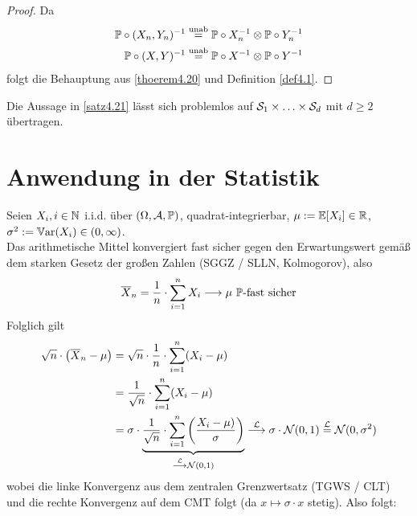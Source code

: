 \begin{proof}
	Da
	\begin{align*}
		\P\circ (X_n,Y_n)^{-1}&\stackeq{\text{unab}}\P\circ X_n^{-1}\otimes\P\circ Y_n^{-1}\\
		\P\circ (X,Y)^{-1}&\stackeq{\text{unab}}\P\circ X^{-1}\otimes\P\circ Y^{-1}
	\end{align*}
	folgt die Behauptung aus \ref{thoerem4.20} und Definition \ref{def4.1}.
\end{proof}

\begin{bemerkungnr}\label{bemerkung4.22}
	Die Aussage in \ref{satz4.21} lässt sich problemlos auf $\S_1\times\ldots\times\S_d$ mit $d\geq2$ übertragen.
\end{bemerkungnr}

\section*{Anwendung in der Statistik}
Seien $X_i,i\in\N$ i.i.d. über $(\Omega,\A,\P)$, quadrat-integrierbar, $\mu:=\E[X_i]\in\R$,\\ $\sigma^2:=\Var(X_i)\in(0,\infty)$.\\
Das arithmetische Mittel konvergiert fast sicher gegen den Erwartungswert gemäß dem starken Gesetz der großen Zahlen (SGGZ / SLLN, Kolmogorov), also
\begin{align*}
	\overline{X}_n=\frac{1}{n}\cdot\sum\limits_{i=1}^n X_i\stackrel{}{\longrightarrow}\mu~\P\text{-fast sicher}
\end{align*}
Folglich gilt
\begin{equation}
	\label{eqAnwendungInDerStatistik}
	\begin{aligned}
		\sqrt{n}\cdot\big(\overline{X}_n-\mu\big)
		&=\sqrt{n}\cdot\frac{1}{n}\cdot\sum\limits_{i=1}^n(X_i-\mu)\\
		&=\frac{1}{\sqrt{n}}\cdot\sum\limits_{i=1}^n(X_i-\mu)\\
		&=\sigma\cdot\underbrace{\frac{1}{\sqrt{n}}\cdot\sum\limits_{i=1}^n\left(\frac{X_i-\mu)}{\sigma}\right)}_{\stackrel{\L}{\longrightarrow}\mathcal{N}(0,1)}\stackrel{\L}{\longrightarrow}\sigma\cdot\mathcal{N}(0,1)\stackeq{\L}\mathcal{N}(0,\sigma^2)
	\end{aligned}
\end{equation}
wobei die linke Konvergenz aus dem zentralen Grenzwertsatz (TGWS / CLT) und die rechte Konvergenz auf dem CMT folgt (da $x\mapsto\sigma\cdot x$ stetig). Also folgt:
